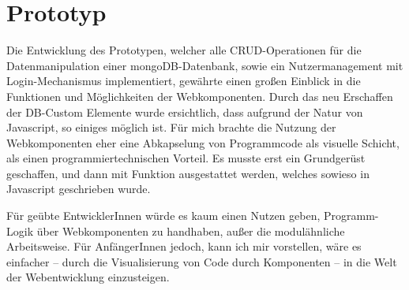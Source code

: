 \section{Prototyp}
Die Entwicklung des Prototypen, welcher alle CRUD-Operationen für die Datenmanipulation einer mongoDB-Datenbank, sowie ein Nutzermanagement mit Login-Me\-cha\-nis\-mus implementiert, gewährte einen großen Einblick in die Funktionen und Möglichkeiten der Webkomponenten. Durch das neu Erschaffen der DB-Custom Elemente wurde ersichtlich, dass aufgrund der Natur von Javascript, so einiges möglich ist. Für mich brachte die Nutzung der Webkomponenten eher eine Abkapselung von Programmcode als visuelle Schicht, als einen programmiertechnischen Vorteil. Es musste erst ein Grundgerüst geschaffen, und dann mit Funktion ausgestattet werden, welches sowieso in Javascript geschrieben wurde. 

Für geübte EntwicklerInnen würde es kaum einen Nutzen geben, Programm-Logik über Webkomponenten zu handhaben, außer die modulähnliche Arbeitsweise. Für AnfängerInnen jedoch, kann ich mir vorstellen, wäre es einfacher -- durch die Visualisierung von Code durch Komponenten -- in die Welt der Webentwicklung einzusteigen. 